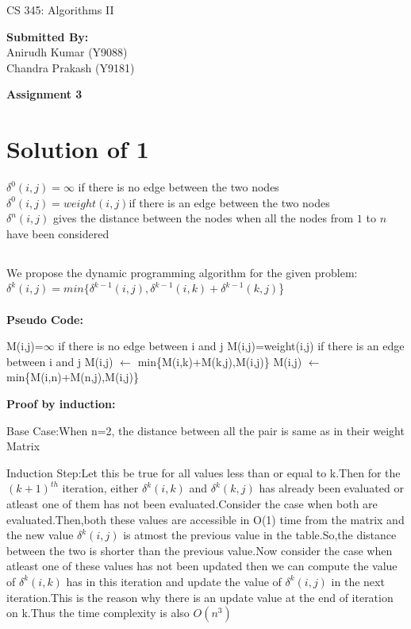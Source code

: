 \documentclass[a4paper,10pt]{article}
\begin{document}
\begin{center}{\Huge CS 345: Algorithms II}\\
\begin{flushright}
\textbf{Submitted By:}\\
Anirudh Kumar (Y9088)\\
Chandra Prakash (Y9181)
\end{flushright}
\LARGE \textbf{Assignment 3}\\
\end{center}
\section{Solution of 1}
$\delta^0(i,j)=\infty $ if there is no edge between the two nodes\\
$\delta^0(i,j)=weight(i,j) $if there is an edge between the two nodes\\
$\delta^n(i,j)$ gives the distance between the nodes when all the nodes from $1$ to $n$ have been considered
\subsection{}We propose the dynamic programming algorithm for the given problem:\\
$\delta^k(i,j)=min\{\delta^{k-1}(i,j),\delta^{k-1}(i,k)+\delta^{k-1}(k,j)$\}\\\\
\textbf{Pseudo Code:}
\begin{algorithmic}
\State M(i,j)=$\infty$ if there is no edge between i and j
\State M(i,j)=weight(i,j) if there is an edge between i and j
    \State M(i,j) $\leftarrow$ min\{M(i,k)+M(k,j),M(i,j)\}
   \EndFor
  \EndFor
 \EndFor
   \State M(i,j) $\leftarrow$ min\{M(i,n)+M(n,j),M(i,j)\}
  \EndFor
 \EndFor
\EndFunction
\end{algorithmic}
\textbf{Proof by induction:}
\begin{description}
\item{Base Case:}When n=2, the distance between all the pair is same as in their weight Matrix\\
\item{Induction Step:}Let this be true for all values less than or equal to k.Then for the $(k+1)^{th}$ iteration, either $\delta^k(i,k)$ and $\delta^k(k,j)$ has already been evaluated or atleast one of them has not been evaluated.Consider the case when both are evaluated.Then,both these values are accessible in O(1) time from the matrix and the new value $\delta^k(i,j)$ is atmost the previous value in the table.So,the distance between the two is shorter than the previous value.Now consider the case when atleast one of these values has not been updated then we can compute the value of $\delta^k(i,k)$ has in this iteration and update the value of $\delta^k(i,j)$ in the next iteration.This is the reason why there is an update value at the end of iteration on k.Thus the time complexity is also $O(n^3)$\\
\end{description}
\end{document}
